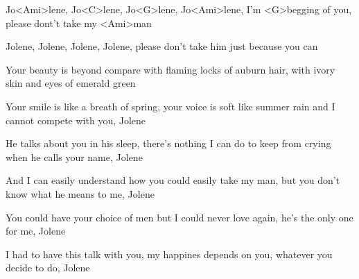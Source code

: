 

\zr
Jo<Ami>lene, Jo<C>lene, Jo<G>lene, Jo<Ami>lene,
I'm <G>begging of you, please dont't take my <Ami>man

Jolene, Jolene, Jolene, Jolene,
please don't take him just because you can
\kr

\zs
Your beauty is beyond compare
with flaming locks of auburn hair,
with ivory skin and eyes of emerald green

Your smile is like a breath of spring,
your voice is soft like summer rain
and I cannot compete with you, Jolene
\ks

\zs
He talks about you in his sleep,
there's nothing I can do to keep
from crying when he calls your name, Jolene

And I can easily understand 
how you could easily take my man,
but you don't know what he means to me, Jolene
\ks

\zr\kr

\zs
You could have your choice of men
but I could never love again,
he's the only one for me, Jolene

I had to have this talk with you,
my happines depends on you,
whatever you decide to do, Jolene
\ks
 
\zr\kr

\kp
